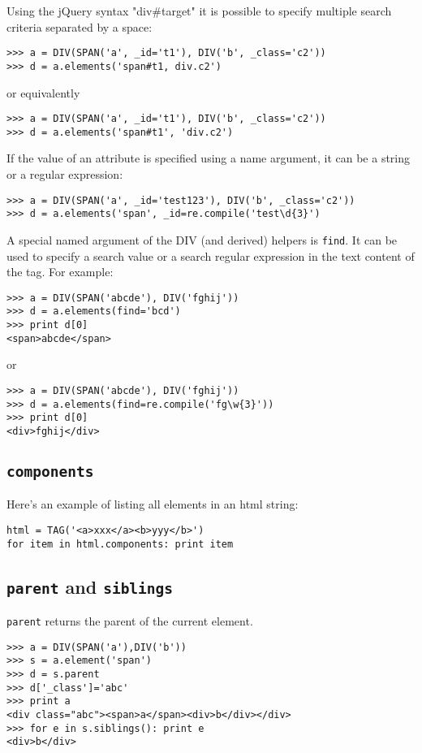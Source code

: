 \documentclass[justified,sixbynine,notoc]{tufte-book}
\def\ft{\small\tt}
\def\inxx#1{\index{#1}}
\begin{document}
\begin{fullwidth}
Using the jQuery syntax "div\#target" it is possible to specify multiple search criteria separated by a space:
\begin{lstlisting}
>>> a = DIV(SPAN('a', _id='t1'), DIV('b', _class='c2'))
>>> d = a.elements('span#t1, div.c2')
\end{lstlisting}
\noindent or equivalently
\begin{lstlisting}
>>> a = DIV(SPAN('a', _id='t1'), DIV('b', _class='c2'))
>>> d = a.elements('span#t1', 'div.c2')
\end{lstlisting}

If the value of an attribute is specified using a name argument, it can be a string or a regular expression:
\begin{lstlisting}
>>> a = DIV(SPAN('a', _id='test123'), DIV('b', _class='c2'))
>>> d = a.elements('span', _id=re.compile('test\d{3}')
\end{lstlisting}

A special named argument of the DIV (and derived) helpers is {\ft find}. It can be used to specify a search value or a search regular expression in the text content of the tag. For example:
\begin{lstlisting}
>>> a = DIV(SPAN('abcde'), DIV('fghij'))
>>> d = a.elements(find='bcd')
>>> print d[0]
<span>abcde</span>
\end{lstlisting}
\noindent or
\begin{lstlisting}
>>> a = DIV(SPAN('abcde'), DIV('fghij'))
>>> d = a.elements(find=re.compile('fg\w{3}'))
>>> print d[0]
<div>fghij</div>
\end{lstlisting}

\goodbreak\subsection{{\ft components} \inxx{components}}

Here's an example of listing all elements in an html string:
\begin{lstlisting}
html = TAG('<a>xxx</a><b>yyy</b>')
for item in html.components: print item
\end{lstlisting}

\inxx{parent} \inxx{sibling}

\goodbreak\subsection{{\ft parent} and {\ft siblings}}

{\ft parent} returns the parent of the current element.
\begin{lstlisting}
>>> a = DIV(SPAN('a'),DIV('b'))
>>> s = a.element('span')
>>> d = s.parent
>>> d['_class']='abc'
>>> print a
<div class="abc"><span>a</span><div>b</div></div>
>>> for e in s.siblings(): print e
<div>b</div>
\end{lstlisting}


\end{fullwidth}
\end{document}
